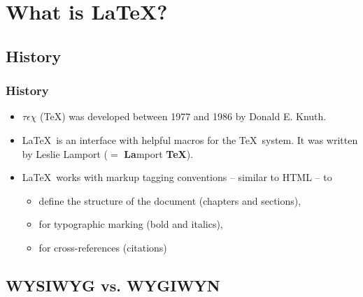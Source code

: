 \section{What is \LaTeX ?}

\subsection{History}

\begin{frame}
\frametitle{History}

\begin{itemize}
	\item $\tau \epsilon \chi$ (\TeX ) was developed between 1977 and 1986 by Donald E. Knuth.
	
	\item \LaTeX\ is an interface with helpful macros for the \TeX\ system. It was written by Leslie Lamport ($=$ \textbf{La}mport \textbf{\TeX }). 
	
	
	\item \LaTeX\ works with markup tagging conventions -- similar to HTML -- to 
	
	\begin{itemize}
		\item define the structure of the document (\fe chapters and sections),
		
		\item for typographic marking (\fe bold and italics), 
		
		\item for cross-references (\fe citations)
	\end{itemize}

\end{itemize}

\end{frame}


\subsection{WYSIWYG vs. WYGIWYN}

